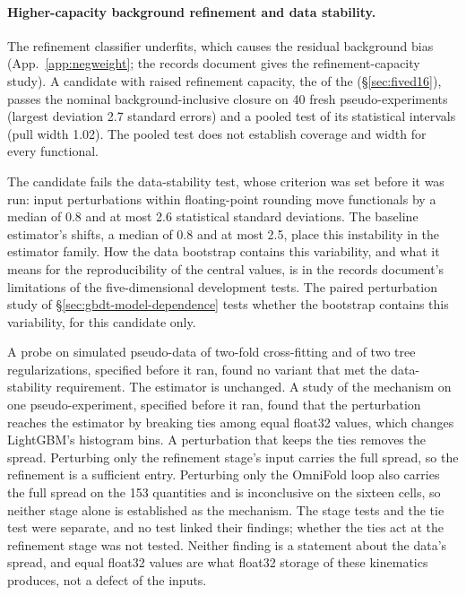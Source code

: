 \paragraph{Higher-capacity background refinement and data stability.}

The refinement classifier underfits, which causes the residual background bias (App.~\ref{app:negweight}; the records document gives the refinement-capacity study). A candidate with raised refinement capacity, the \estMultiD{} of the \resSixteen{} (\S\ref{sec:fived16}), passes the nominal background-inclusive closure on 40 fresh pseudo-experiments (largest deviation 2.7 standard errors) and a pooled test of its statistical intervals (pull width 1.02). The pooled test does not establish coverage and width for every functional.

The candidate fails the data-stability test, whose criterion was set before it was run: input perturbations within floating-point rounding move functionals by a median of 0.8 and at most 2.6 statistical standard deviations. The baseline estimator's shifts, a median of 0.8 and at most 2.5, place this instability in the estimator family. How the data bootstrap contains this variability, and what it means for the reproducibility of the central values, is in the records document's limitations of the five-dimensional development tests. The paired perturbation study of \S\ref{sec:gbdt-model-dependence} tests whether the bootstrap contains this variability, for this candidate only.

A probe on simulated pseudo-data of two-fold cross-fitting and of two tree regularizations, specified before it ran, found no variant that met the data-stability requirement. The estimator is unchanged. A study of the mechanism on one pseudo-experiment, specified before it ran, found that the perturbation reaches the estimator by breaking ties among equal float32 values, which changes LightGBM's histogram bins. A perturbation that keeps the ties removes the spread. Perturbing only the refinement stage's input carries the full spread, so the refinement is a sufficient entry. Perturbing only the OmniFold loop also carries the full spread on the 153 quantities and is inconclusive on the sixteen cells, so neither stage alone is established as the mechanism. The stage tests and the tie test were separate, and no test linked their findings; whether the ties act at the refinement stage was not tested. Neither finding is a statement about the data's spread, and equal float32 values are what float32 storage of these kinematics produces, not a defect of the inputs.

